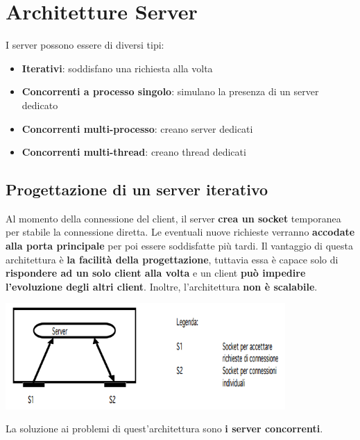 \documentclass[12pt]{article}
\begin{document}
\section{Architetture Server}
I server possono essere di diversi tipi:
\begin{itemize}
    \item \textbf{Iterativi}: soddisfano una richiesta alla volta
    \item \textbf{Concorrenti a processo singolo}: simulano la presenza di un server dedicato
    \item \textbf{Concorrenti multi-processo}: creano server dedicati
    \item \textbf{Concorrenti multi-thread}: creano thread dedicati
\end{itemize}
\subsection{Progettazione di un server iterativo}
Al momento della connessione del client, il server \textbf{crea un socket} temporanea per stabile la connessione diretta. Le eventuali nuove richieste verranno \textbf{accodate alla porta principale} per poi essere soddisfatte più tardi. Il vantaggio di questa architettura è \textbf{la facilità della progettazione}, tuttavia essa è capace solo di \textbf{rispondere ad un solo client alla volta} e un client \textbf{può impedire l'evoluzione degli altri client}. Inoltre, l'architettura \textbf{non è scalabile}.
\begin{center}
    \includegraphics[width = 0.80\textwidth]{Images/35.PNG}
\end{center}
La soluzione ai problemi di quest'architettura sono \textbf{i server concorrenti}.
\end{document}
